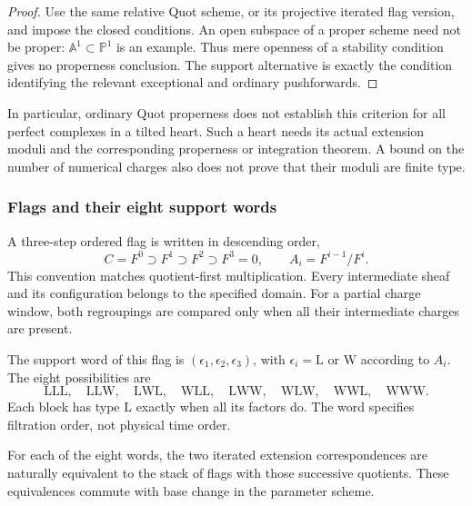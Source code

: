\begin{proof}
Use the same relative Quot scheme, or its projective iterated flag
version, and impose the closed conditions. An open subspace of a
proper scheme need not be proper: $\mathbb A^1\subset\mathbb P^1$
is an example. Thus mere openness of a stability condition gives
no properness conclusion. The support alternative is exactly the
condition identifying the relevant exceptional and ordinary
pushforwards.
\end{proof}

In particular, ordinary Quot properness does not establish this
criterion for all perfect complexes in a tilted heart. Such a heart
needs its actual extension moduli and the corresponding properness
or integration theorem. A bound on the number of numerical charges
also does not prove that their moduli are finite type.

\subsubsection*{Flags and their eight support words}

A three-step ordered flag is written in descending order,
\[
 C=F^0\supset F^1\supset F^2\supset F^3=0,
 \qquad A_i=F^{i-1}/F^i.
\]
This convention matches quotient-first multiplication.
Every intermediate sheaf and its configuration belongs to the
specified domain. For a partial charge window, both regroupings
are compared only when all their intermediate charges are present.

\begin{definition}
\label{def:eight-local-wrapped-binary-words}
The support word of this flag is
$(\epsilon_1,\epsilon_2,\epsilon_3)$, with
$\epsilon_i=\mathrm L$ or $\mathrm W$ according to $A_i$.
The eight possibilities are
\[
 \mathrm{LLL},\quad\mathrm{LLW},\quad\mathrm{LWL},\quad
 \mathrm{WLL},\quad\mathrm{LWW},\quad\mathrm{WLW},\quad
 \mathrm{WWL},\quad\mathrm{WWW}.
\]
Each block has type $\mathrm L$ exactly when all its factors do.
The word specifies filtration order, not physical time order.
\end{definition}

\begin{proposition}
\label{prop:eight-two-step-flag-stacks}
For each of the eight words, the two iterated extension
correspondences are naturally equivalent to the stack of flags
with those successive quotients. These equivalences commute with
base change in the parameter scheme.
\end{proposition}

